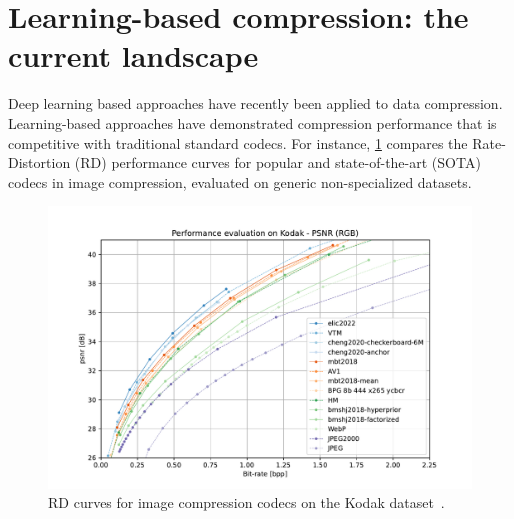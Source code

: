 



\section{Learning-based compression: the current landscape}

Deep learning based approaches have recently been applied to data compression.
Learning-based approaches have demonstrated compression performance that is competitive with traditional standard codecs.
For instance, \cref{fig:intro/rd-curves} compares the Rate-Distortion (RD) performance curves for popular and state-of-the-art (SOTA) codecs in image compression, evaluated on generic non-specialized datasets.

\begin{figure}[htbp]
  \centering
  \includegraphics[width=\linewidth]{img/introduction/rd-curves-image-kodak-psnr-rgb.pdf}
  \caption[RD curves of all codecs on the Kodak dataset]{%
    RD curves for image compression codecs on the Kodak dataset~\cite{kodak_dataset}.%
  }
  \label{fig:intro/rd-curves}
\end{figure}


